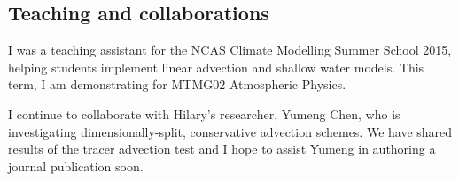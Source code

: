 \documentclass[a4paper]{article}
\begin{document}
\subsection*{Teaching and collaborations}
I was a teaching assistant for the NCAS Climate Modelling Summer School 2015, helping students implement linear advection and shallow water models.  This term, I am demonstrating for MTMG02 Atmospheric Physics.

I continue to collaborate with Hilary's researcher, Yumeng Chen, who is investigating dimensionally-split, conservative advection schemes.  We have shared results of the \citet{schaer2002} tracer advection test and I hope to assist Yumeng in authoring a journal publication soon.

                                                 

\end{document}
